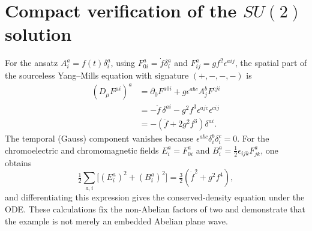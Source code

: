 \documentclass[11pt,a4paper]{article}
\theoremstyle{tmon}
\theoremstyle{definition}
\begin{document}
\section{Compact verification of the $SU(2)$ solution}
For the ansatz $A_i^a=f(t)\delta_i^a$, using $F_{0i}^a=\dot f\delta_i^a$ and $F_{ij}^a=g f^2\epsilon^{aij}$, the spatial part of the sourceless Yang--Mills equation with signature $(+,-,-,-)$ is
\begin{align*}
(D_\mu F^{\mu i})^a
&=\partial_0F^{a0i}+g\epsilon^{abc}A_j^bF^{cji}\\
&=-\ddot f\,\delta^{ai}-g^2f^3\epsilon^{ajc}\epsilon^{cij}\\
&=-(\ddot f+2g^2f^3)\delta^{ai}.
\end{align*}
The temporal (Gauss) component vanishes because $\epsilon^{abc}\delta_i^b\delta_i^c=0$. For the chromoelectric and chromomagnetic fields $E_i^a=F_{0i}^a$ and $B_i^a=\tfrac12\epsilon_{ijk}F_{jk}^a$, one obtains
\[
\tfrac12\sum_{a,i}\big[(E_i^a)^2+(B_i^a)^2\big]
=\tfrac32(\dot f^2+g^2f^4),
\]
and differentiating this expression gives the conserved-density equation under the ODE. These calculations fix the non-Abelian factors of two and demonstrate that the example is not merely an embedded Abelian plane wave.
\end{document}
